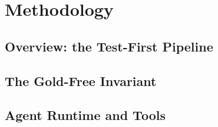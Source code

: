 \chapter{Methodology}
\label{ch:methodology}

\section{Overview: the Test-First Pipeline}
\label{sec:method-overview}

\section{The Gold-Free Invariant}
\label{sec:method-goldfree}

\section{Agent Runtime and Tools}
\label{sec:method-runtime}

